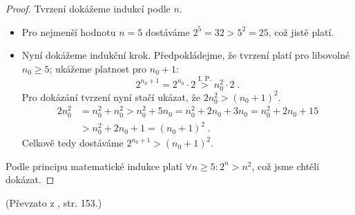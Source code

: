 \begin{proof}
    Tvrzení dokážeme indukcí podle $n$.
    \begin{itemize}
        \item Pro nejmenší hodnotu $n=5$ dostáváme $2^5=32>5^2=25$, což jistě platí.
        \item Nyní dokážeme indukční krok. Předpokládejme, že tvrzení platí pro libovolné $n_0\geq 5$; ukážeme platnost pro $n_0+1$:
        \begin{equation*}
            2^{n_0+1}=2^{n_0}\cdot 2\stackrel{\text{I. P.}}{>} n_0^2 \cdot 2\; .
        \end{equation*}
        Pro dokázání tvrzení nyní stačí ukázat, že $2n_0^2 > (n_0+1)^2$.
        \begin{align*}
            2n_0^2 &= n_0^2+n_0^2>n_0^2+5n_0=n_0^2+2n_0+3n_0=n_0^2+2n_0+15\\
            &>n_0^2+2n_0+1=(n_0+1)^2\; .
        \end{align*}
        Celkově tedy dostáváme $2^{n_0+1}>(n_0+1)^2$.
    \end{itemize}
    Podle principu matematické indukce platí $\forall n\geq 5: 2^n>n^2$, což jsme chtěli dokázat.
\end{proof}
(Převzato z \cite{ChartrandPolimeniZhang2014}, str. 153.)

